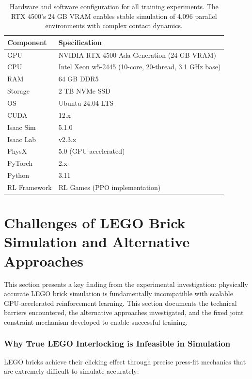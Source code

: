 \documentclass[12pt,a4paper,oneside]{report}
\begin{document}
\begin{table}[h]
\centering
\begin{tabular}{|l|l|}
\hline
\textbf{Component} & \textbf{Specification} \\
\hline
GPU & NVIDIA RTX 4500 Ada Generation (24 GB VRAM) \\
CPU & Intel Xeon w5-2445 (10-core, 20-thread, 3.1 GHz base) \\
RAM & 64 GB DDR5 \\
Storage & 2 TB NVMe SSD \\
OS & Ubuntu 24.04 LTS \\
CUDA & 12.x \\
Isaac Sim & 5.1.0 \\
Isaac Lab & v2.3.x \\
PhysX & 5.0 (GPU-accelerated) \\
PyTorch & 2.x \\
Python & 3.11 \\
RL Framework & RL Games (PPO implementation) \\
\hline
\end{tabular}
\caption{Hardware and software configuration for all training experiments. The RTX 4500's 24 GB VRAM enables stable simulation of 4{,}096 parallel environments with complex contact dynamics.}
\end{table}

\section{Challenges of LEGO Brick Simulation and Alternative Approaches}

This section presents a key finding from the experimental investigation: physically accurate LEGO brick simulation is fundamentally incompatible with scalable GPU-accelerated reinforcement learning. This section documents the technical barriers encountered, the alternative approaches investigated, and the fixed joint constraint mechanism developed to enable successful training.

\subsubsection{Why True LEGO Interlocking is Infeasible in Simulation}

LEGO bricks achieve their clicking effect through precise press-fit mechanics that are extremely difficult to simulate accurately:
\end{document}
